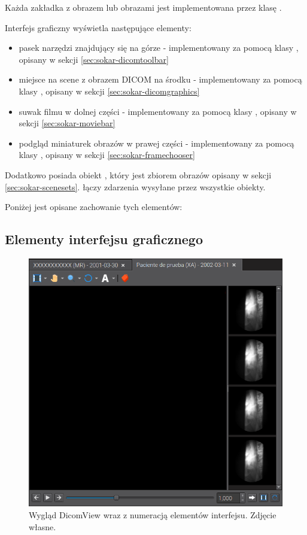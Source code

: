 \label{sec:sokar-dicomview}
Każda zakładka z obrazem lub obrazami jest implementowana przez klasę .

Interfejs graficzny  wyświetla następujące elementy:
\begin{itemize}
    \item pasek narzędzi znajdujący się na górze - implementowany za pomocą klasy , opisany w sekcji \ref{sec:sokar-dicomtoolbar}
    \item miejsce na scene z obrazem DICOM na środku - implementowany za pomocą klasy , opisany w sekcji \ref{sec:sokar-dicomgraphics}
    \item suwak filmu w dolnej części - implementowany za pomocą klasy , opisany w sekcji \ref{sec:sokar-moviebar}
    \item podgląd miniaturek obrazów w prawej części - implementowany za pomocą klasy , opisany w sekcji \ref{sec:sokar-framechooser}
\end{itemize}

Dodatkowo posiada obiekt , który jest zbiorem obrazów opisany w sekcji \ref{sec:sokar-scenesets}.
 łączy zdarzenia wysyłane przez wszystkie obiekty.

Poniżej jest opisane zachowanie tych elementów:

\subsection{Elementy interfejsu graficznego}

\begin{figure}[!htbp]
    \centering
    \includegraphics[width=\textwidth]{img/sokar-dicomview-001.png}
    \caption{Wygląd DicomView wraz z numeracją elementów interfejsu. Zdjęcie własne.}
    \label{fig:sokar-dicomview001}
\end{figure}

